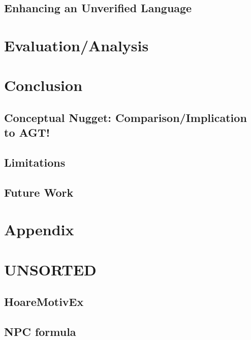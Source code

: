 
\section{Enhancing an Unverified Language}





\chapter{Evaluation/Analysis}
\label{ch:evaluation-analysis}


\chapter{Conclusion}
\label{ch:conclusion}


\section{Conceptual Nugget: Comparison/Implication to AGT!}

\section{Limitations}
\label{sec:limitations}


\section{Future Work}
\label{sec:future-work}


\chapter{Appendix}


\chapter{UNSORTED}

\section{HoareMotivEx}
\label{sec:hoaremotivex}


\section{NPC formula}
\label{sec:npc-formula}
